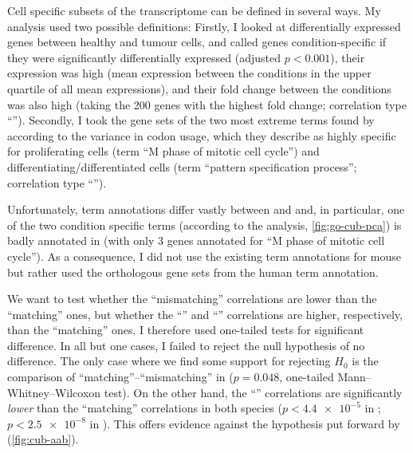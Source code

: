 Cell specific subsets of the transcriptome can be defined in several ways. My
analysis used two possible definitions: Firstly, I looked at differentially
expressed genes between healthy and tumour cells, and called genes
condition-specific if they were significantly differentially expressed (adjusted
\(p < 0.001\)), their expression was high (mean expression between the
conditions in the upper quartile of all mean expressions), and their fold change
between the conditions was also high (taking the \num{200} genes with the
highest fold change; correlation type “”). Secondly, I took the gene
sets of the two most extreme \go terms found by \citet{Gingold:2014} according
to the variance in codon usage, which they describe as highly specific for
proliferating cells (\go term “M phase of mitotic cell cycle”) and
differentiating/differentiated cells (\go term “pattern specification process”;
correlation type “”).

Unfortunately, \go term annotations differ vastly between \hsa and \mmu and, in
particular, one of the two condition specific \go terms (according to the \pca
analysis, \cref{fig:go-cub-pca}) is badly annotated in \mmu (with only \num{3}
genes annotated for “M phase of mitotic cell cycle”). As a consequence, I did
not use the existing \go term annotations for mouse but rather used the
orthologous gene sets from the human \go term annotation.

We want to test whether the “mismatching” correlations are lower than the
“matching” ones, but whether the “” and “” correlations are
higher, respectively, than the “matching” ones. I therefore used one-tailed
tests for significant difference. In all but one cases, I failed to reject the
null hypothesis of no difference. The only case where we find some support for
rejecting \(H_0\) is the comparison of “matching”--“mismatching” in \hsa (\(p =
0.048\), one-tailed Mann–Whitney–Wilcoxon test). On the other hand, the
“” correlations are significantly \emph{lower} than the “matching”
correlations in both species (\(p < \num{4.4e-5}\) in \mmu; \(p < \num{2.5e-8}\)
in \hsa). This offers evidence against the hypothesis put forward by
\citet{Gingold:2014} (\cref{fig:cub-aab}).

